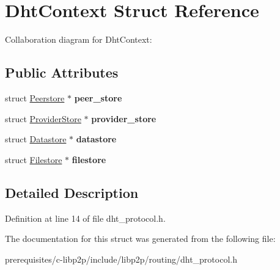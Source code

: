 \hypertarget{struct_dht_context}{}\section{Dht\+Context Struct Reference}
\label{struct_dht_context}


Collaboration diagram for Dht\+Context\+:
\subsection*{Public Attributes}
\begin{DoxyCompactItemize}
\item 
\mbox{\label{struct_dht_context_ac466ed9a985c249f80914e053f6bcfbd}} 
struct \mbox{\hyperlink{struct_peerstore}{Peerstore}} $\ast$ {\bfseries peer\+\_\+store}
\item 
\mbox{\label{struct_dht_context_a0a3d826e242a00771f00bd7a4fdb414f}} 
struct \mbox{\hyperlink{struct_provider_store}{Provider\+Store}} $\ast$ {\bfseries provider\+\_\+store}
\item 
\mbox{\label{struct_dht_context_a1e1bc5032a2f08244d3d91820f89bdac}} 
struct \mbox{\hyperlink{struct_datastore}{Datastore}} $\ast$ {\bfseries datastore}
\item 
\mbox{\label{struct_dht_context_aad7b0a74788f0db3960493afd76adc0e}} 
struct \mbox{\hyperlink{struct_filestore}{Filestore}} $\ast$ {\bfseries filestore}
\end{DoxyCompactItemize}


\subsection{Detailed Description}


Definition at line 14 of file dht\+\_\+protocol.\+h.



The documentation for this struct was generated from the following file\+:\begin{DoxyCompactItemize}
\item 
prerequisites/c-\/libp2p/include/libp2p/routing/dht\+\_\+protocol.\+h\end{DoxyCompactItemize}

